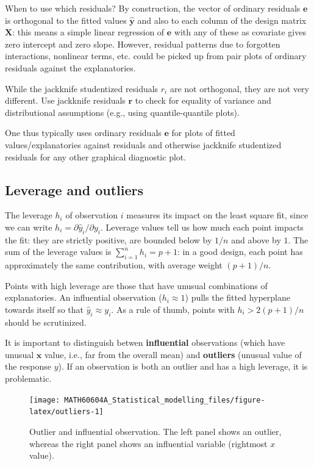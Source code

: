 \documentclass[
  11pt,
  letterpaper,
]{book}
\theoremstyle{definition}
\theoremstyle{definition}
\theoremstyle{definition}
\theoremstyle{remark}
\begin{document}
When to use which residuals? By construction, the vector of ordinary residuals \(\boldsymbol{e}\) is orthogonal to the fitted values \(\widehat{\boldsymbol{y}}\) and also to each column of the design matrix \(\mathbf{X}\): this means a simple linear regression of \(\boldsymbol{e}\) with any of these as covariate gives zero intercept and zero slope. However, residual patterns due to forgotten interactions, nonlinear terms, etc. could be picked up from pair plots of ordinary residuals against the explanatories.

While the jackknife studentized residuals \(r_i\) are not orthogonal, they are not very different. Use jackknife residuals \(\boldsymbol{r}\) to check for equality of variance and distributional assumptions (e.g., using quantile-quantile plots).

One thus typically uses ordinary residuals \(\boldsymbol{e}\) for plots of fitted values/explanatories against residuals and otherwise jackknife studentized residuals for any other graphical diagnostic plot.

\hypertarget{leverage-and-outliers}{%
\subsection{Leverage and outliers}\label{leverage-and-outliers}}

The leverage \(h_i\) of observation \(i\) measures its impact on the least square fit, since we can write \(h_i = \partial \widehat{y}_i/\partial y_i\). Leverage values tell us how much each point impacts the fit: they are strictly positive, are bounded below by \(1/n\) and above by \(1\). The sum of the leverage values is \(\sum_{i=1}^n h_i=p+1\): in a good design, each point has approximately the same contribution, with average weight \((p+1)/n\).

Points with high leverage are those that have unusual combinations of explanatories. An influential observation (\(h_i\approx 1\)) pulls the fitted hyperplane towards itself so that \(\hat{y}_i \approx y_i\). As a rule of thumb, points with \(h_i> 2(p+1)/n\) should be scrutinized.

It is important to distinguish betwen \textbf{influential} observations (which have unusual \(\mathbf{x}\) value, i.e., far from the overall mean) and \textbf{outliers} (unusual value of the response \(y\)).
If an observation is both an outlier and has a high leverage, it is problematic.

\begin{figure}

{\centering \texttt{[image: MATH60604A\_Statistical\_modelling\_files/figure-latex/outliers-1]} 

}

\caption{Outlier and influential observation. The left panel shows an outlier, whereas the right panel shows an influential variable (rightmost $x$ value).}\label{fig:outliers}
\end{figure}
\end{document}
